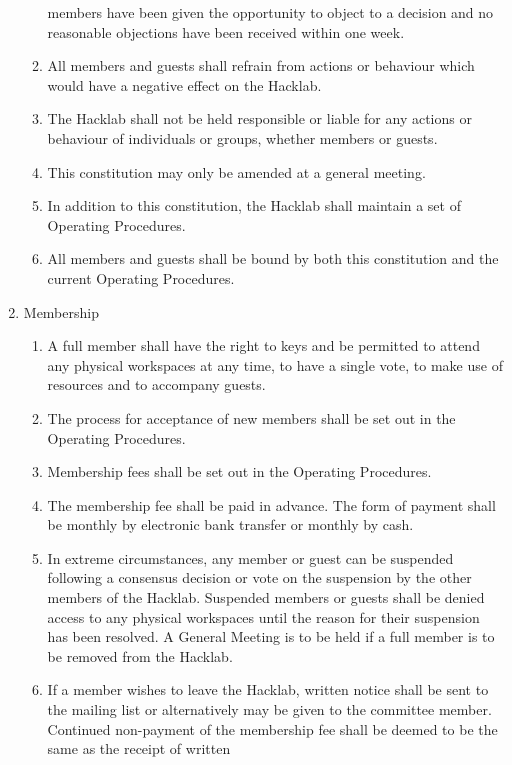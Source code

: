 \documentclass{article}
\begin{document}
\begin{enumerate}
\begin{enumerate}
      members have been given the opportunity to object to a decision
      and no reasonable objections have been received within one week.
      \cbdelete
    \item All members and guests shall refrain from actions or
      behaviour which would have a negative effect on the Hacklab.
    \item The Hacklab shall not be held responsible or liable for
      any actions or behaviour of individuals or groups, whether
      members or guests.
    \item This constitution may only be amended at a general meeting.
    \item In addition to this constitution, the Hacklab shall maintain
      a set of Operating Procedures.
    \item All members and guests shall be bound by both this
      constitution and the current Operating Procedures.
    \end{enumerate} %
  \item Membership
    \begin{enumerate}
    \item A full member shall have the right to keys and be permitted
      to attend any physical workspaces at any time, to have a single
      vote, to make use of resources and to accompany guests.
    \item The process for acceptance of new members shall be set out
      in the Operating Procedures.
    \item Membership fees shall be set out in the Operating Procedures. 
    \item The membership fee shall be paid in advance. The form of
      payment shall be monthly by electronic bank transfer or monthly
      by cash.
    \item \cbstart In extreme circumstances, any member or guest can be
      suspended following a consensus decision or vote on the
      suspension by the other members of the Hacklab. Suspended members
      or guests shall be denied access to any physical workspaces
      until the reason for their suspension has been resolved. A General Meeting 
      is to be held if a full member is to be removed from the Hacklab.
    \item If a member wishes to leave the Hacklab, written notice
      shall be sent to the mailing list or alternatively may be given
      to the committee member. Continued non-payment of the membership
      fee shall be deemed to be the same as the receipt of written

\end{enumerate}
\end{enumerate}
\end{document}
